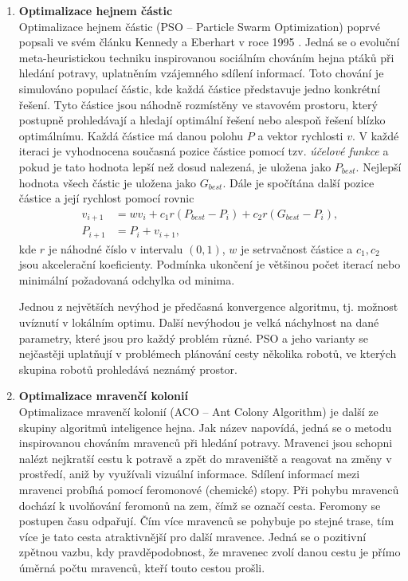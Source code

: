 \begin{enumerate}
	\item \textbf{Optimalizace hejnem částic}\\
	Optimalizace hejnem částic (PSO -- Particle Swarm Optimization) poprvé popsali ve svém článku Kennedy a Eberhart v roce 1995 \cite{Kennedy1995}. Jedná se o evoluční meta-heuristickou techniku inspirovanou sociálním chováním hejna ptáků při hledání potravy, uplatněním vzájemného sdílení informací. Toto chování je simulováno populací částic, kde každá částice představuje jedno konkrétní řešení. Tyto částice jsou náhodně rozmístěny ve stavovém prostoru, který postupně prohledávají a hledají optimální řešení nebo alespoň řešení blízko optimálnímu. Každá částice má danou polohu $P$ a vektor rychlosti $v$. V každé iteraci je vyhodnocena současná pozice částice pomocí tzv. \emph{účelové funkce} a pokud je tato hodnota lepší než dosud nalezená, je uložena jako $P_{best}$. Nejlepší hodnota všech částic je uložena jako $G_{best}$. Dále je spočítána další pozice částice a její rychlost pomocí rovnic
	\begin{subequations}
		\begin{align}
		v_{i+1}&=wv_i+c_1r(P_{best}-P_i)+c_2r(G_{best}-P_i),\\
		P_{i+1}&=P_i+v_{i+1},
		\end{align}
	\end{subequations}
	kde $r$ je náhodné číslo v intervalu $(0,1)$, $w$ je setrvačnost částice a $c_1,c_2$ jsou akcelerační koeficienty. Podmínka ukončení je většinou počet iterací nebo minimální požadovaná odchylka od minima.
	
	Jednou z největších nevýhod je předčasná konvergence algoritmu, tj. možnost uvíznutí v lokálním optimu. Další nevýhodou je velká náchylnost na dané parametry, které jsou pro každý problém různé. PSO a jeho varianty se nejčastěji uplatňují v problémech plánování cesty několika robotů, ve kterých skupina robotů prohledává neznámý prostor. \cite{Masehian2007,Asma2017,Nakisa20140901}
	
	\item \textbf{Optimalizace mravenčí kolonií}\\
	Optimalizace mravenčí kolonií (ACO -- Ant Colony Algorithm) je další ze skupiny algoritmů inteligence hejna. Jak název napovídá, jedná se o metodu inspirovanou chováním mravenců při hledání potravy. Mravenci jsou schopni nalézt nejkratší cestu k potravě a zpět do mraveniště a reagovat na změny v prostředí, aniž by využívali vizuální informace. Sdílení informací mezi mravenci probíhá pomocí feromonové (chemické) stopy. Při pohybu mravenců dochází k uvolňování feromonů na zem, čímž se označí cesta. Feromony se postupen času odpařují. Čím více mravenců se pohybuje po stejné trase, tím více je tato cesta atraktivnější pro další mravence. Jedná se o pozitivní zpětnou vazbu, kdy pravděpodobnost, že mravenec zvolí danou cestu je přímo úměrná počtu mravenců, kteří touto cestou prošli. \cite{Liu2006}
	 

\end{enumerate}
